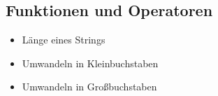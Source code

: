 

	\subsection{Funktionen und Operatoren}
	\begin{frame}
		\slidehead

		\begin{itemize}
			\item Länge eines Strings

			\item Umwandeln in Kleinbuchstaben

			\item Umwandeln in Großbuchstaben
		\end{itemize}
	\end{frame}



